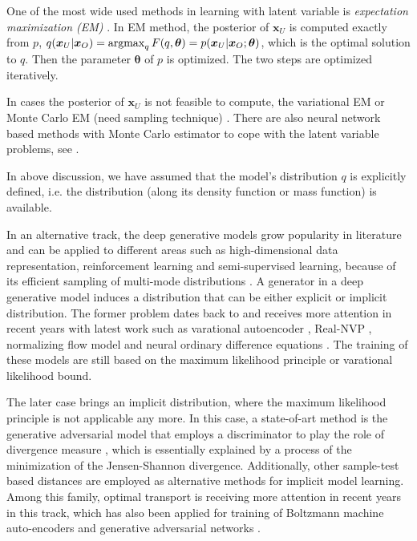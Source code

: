 One of the most wide used methods in learning with latent variable is \textit{expectation maximization (EM)} \cite{DEMP1977em}. In EM method, the posterior of $\bm{x}_U$ is computed exactly from $p$, $q(\bm{x}_U|\bm{x}_O) = \operatorname{argmax}_{q}{F(q, \bm{\theta})} = p(\bm{x}_U|\bm{x}_O; \bm{\theta})$, which is the optimal solution to $q$. Then the parameter $\bm{\theta}$ of $p$ is optimized. The two steps are optimized iteratively.

In cases the posterior of $\bm{x}_U$ is not feasible to compute, the variational EM\cite[section~6.2.2]{wainwright2008graphical} or Monte Carlo EM (need sampling technique) \cite{neath2012convergence}. There are also neural network based methods with Monte Carlo estimator to cope with the latent variable problems, see \cite{DBLP:journals/corr/KingmaW13, kuleshov2017NVIL, lazarogredilla2019learning, goodfellow2014gan}.


In above discussion, we have assumed that the model's distribution $q$ is explicitly defined, i.e. the distribution (along its density function or mass function) is available. 

In an alternative track, the deep generative models grow popularity in literature and can be applied to different areas such as high-dimensional data representation, reinforcement learning and semi-supervised learning, because of its efficient sampling of multi-mode distributions \cite{2017arXiv170100160G}. A generator in a deep generative model induces a distribution that can be either explicit or implicit distribution. The former problem dates back to \cite{deco1995high-order} and receives more attention in recent years with latest work such as varational autoencoder \cite{DBLP:journals/corr/KingmaW13}, Real-NVP \cite{2016arXiv160508803D}, normalizing flow model \cite{2018arXiv180703039K} and neural ordinary difference equations \cite{ricky2018ODE}. The training of these models are still based on the maximum likelihood principle or varational likelihood bound.

The later case brings an implicit distribution, where the maximum likelihood principle is not applicable any more. In this case, a state-of-art method is the generative adversarial model that employs a discriminator to play the role of divergence measure \cite{goodfellow2014gan, 2017arXiv170104862A, NIPS2016_6125}, which is essentially explained by a process of the minimization of the Jensen-Shannon divergence. Additionally, other sample-test based distances are employed as alternative methods for implicit model learning. Among this family, optimal transport is receiving more attention in recent years \cite{santambrogio2015optimal, 2013arXiv1306.0895C} in this track, which has also been applied for training of Boltzmann machine \cite{NIPS2016_6248} auto-encoders\cite{2017arXiv171101558T} and generative adversarial networks \cite{2017arXiv170107875A}.


